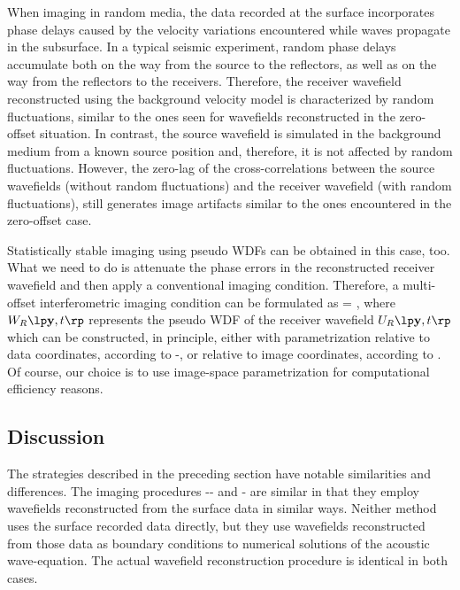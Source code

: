When imaging in random media, the data recorded at the surface
incorporates phase delays caused by the velocity variations
encountered while waves propagate in the subsurface. In a typical
seismic experiment, random phase delays accumulate both on the way
from the source to the reflectors, as well as on the way from the
reflectors to the receivers. Therefore, the receiver wavefield
reconstructed using the background velocity model is characterized by
random fluctuations, similar to the ones seen for wavefields
reconstructed in the zero-offset situation. In contrast, the source
wavefield is simulated in the background medium from a known source
position and, therefore, it is not affected by random
fluctuations. However, the zero-lag of the cross-correlations between
the source wavefields (without random fluctuations) and the receiver
wavefield (with random fluctuations), still generates image artifacts
similar to the ones encountered in the zero-offset case.

Statistically stable imaging using pseudo WDFs can be obtained in this
case, too. What we need to do is attenuate the phase errors in the
reconstructed receiver wavefield and then apply a conventional imaging
condition. Therefore, a multi-offset interferometric imaging condition
can be formulated as
%
\beq
\IA{}{\ym} = \inttm {}  \;,
\eeq
%
where $\WA{R}{\ym,\tm}$ represents the pseudo WDF of the receiver
wavefield $\UA{R}{\ym,\tm}$ which can be constructed, in principle,
either with parametrization relative to data coordinates, according to
-, or relative to image coordinates, according to
. Of course, our choice is to use image-space parametrization
for computational efficiency reasons.

\subsection{Discussion}

The strategies described in the preceding section have notable
similarities and differences.
% 
The imaging procedures -- and
- are similar in that they employ wavefields
reconstructed from the surface data in similar ways. Neither method
uses the surface recorded data directly, but they use wavefields
reconstructed from those data as boundary conditions to numerical
solutions of the acoustic wave-equation. The actual wavefield
reconstruction procedure is identical in both cases.

